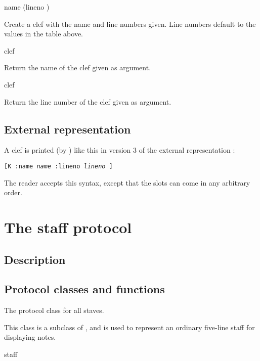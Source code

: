 
 {name \optional (lineno )}

Create a clef with the name and line numbers given.  Line numbers
default to the values in the table above. 

 {clef}

Return the name of the clef given as argument.

 {clef}

Return the line number of the clef given as argument. 

\subsection{External representation}

A clef is printed (by ) like this in version 3
of the external representation :

\texttt{[K :name \textit{name} :lineno \textit{lineno} ]}

The reader accepts this syntax, except that the slots can come in any
arbitrary order. 

\section{The staff protocol}

\subsection{Description}

\subsection{Protocol classes and functions}


The protocol class for all staves. 


This class is a subclass of , and is used to represent an
ordinary five-line staff for displaying notes. 

 {staff}

